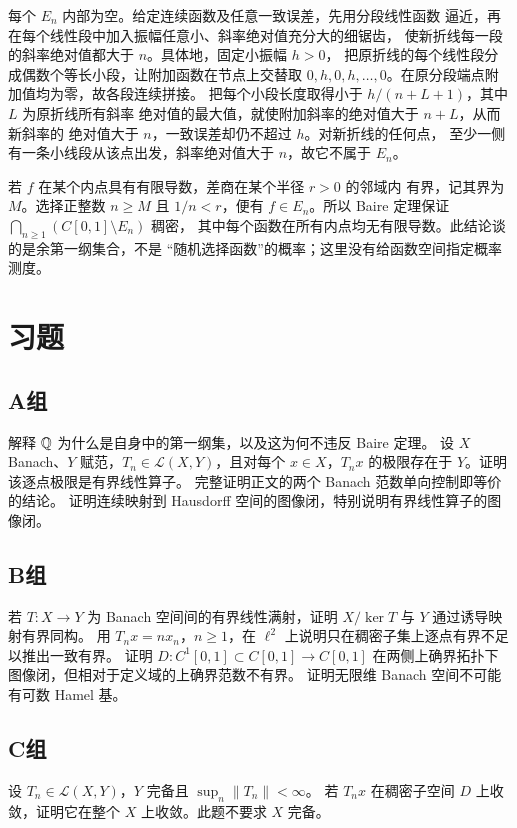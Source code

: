 每个 \(E_n\) 内部为空。给定连续函数及任意一致误差，先用分段线性函数
逼近，再在每个线性段中加入振幅任意小、斜率绝对值充分大的细锯齿，
使新折线每一段的斜率绝对值都大于 \(n\)。具体地，固定小振幅 \(h>0\)，
把原折线的每个线性段分成偶数个等长小段，让附加函数在节点上交替取
\(0,h,0,h,\ldots,0\)。在原分段端点附加值均为零，故各段连续拼接。
把每个小段长度取得小于 \(h/(n+L+1)\)，其中 \(L\) 为原折线所有斜率
绝对值的最大值，就使附加斜率的绝对值大于 \(n+L\)，从而新斜率的
绝对值大于 \(n\)，一致误差却仍不超过 \(h\)。对新折线的任何点，
至少一侧有一条小线段从该点出发，斜率绝对值大于 \(n\)，故它不属于 \(E_n\)。

若 \(f\) 在某个内点具有有限导数，差商在某个半径 \(r>0\) 的邻域内
有界，记其界为 \(M\)。选择正整数 \(n\ge M\) 且 \(1/n<r\)，便有
\(f\in E_n\)。所以 Baire 定理保证 \(\bigcap_{n\ge1}(C[0,1]\setminus E_n)\) 稠密，
其中每个函数在所有内点均无有限导数。此结论谈的是余第一纲集合，不是
“随机选择函数”的概率；这里没有给函数空间指定概率测度。

\section*{习题}
\subsection*{A组}
\begin{enumerate}[label=\textbf{\thechapter.\arabic*.}]
解释 \(\mathbb{Q}\) 为什么是自身中的第一纲集，以及这为何不违反 Baire 定理。
设 \(X\) Banach、\(Y\) 赋范，\(T_n\in\mathcal L(X,Y)\)，且对每个 \(x\in X\)，\(T_nx\) 的极限存在于 \(Y\)。证明该逐点极限是有界线性算子。
完整证明正文的两个 Banach 范数单向控制即等价的结论。
证明连续映射到 Hausdorff 空间的图像闭，特别说明有界线性算子的图像闭。
\end{enumerate}
\subsection*{B组}
\begin{enumerate}[label=\textbf{\thechapter.\arabic*.},resume]
若 \(T:X\to Y\) 为 Banach 空间间的有界线性满射，证明 \(X/\ker T\) 与 \(Y\) 通过诱导映射有界同构。
用 \(T_nx=nx_n\)，\(n\ge1\)，在 \(\ell^2\) 上说明只在稠密子集上逐点有界不足以推出一致有界。
证明 \(D:C^1[0,1]\subset C[0,1]\to C[0,1]\) 在两侧上确界拓扑下图像闭，但相对于定义域的上确界范数不有界。
证明无限维 Banach 空间不可能有可数 Hamel 基。
\end{enumerate}
\subsection*{C组}
\begin{enumerate}[label=\textbf{\thechapter.\arabic*.},resume]
设 \(T_n\in\mathcal L(X,Y)\)，\(Y\) 完备且 \(\sup_n\|T_n\|<\infty\)。
若 \(T_nx\) 在稠密子空间 \(D\) 上收敛，证明它在整个 \(X\) 上收敛。此题不要求 \(X\) 完备。
\end{enumerate}
